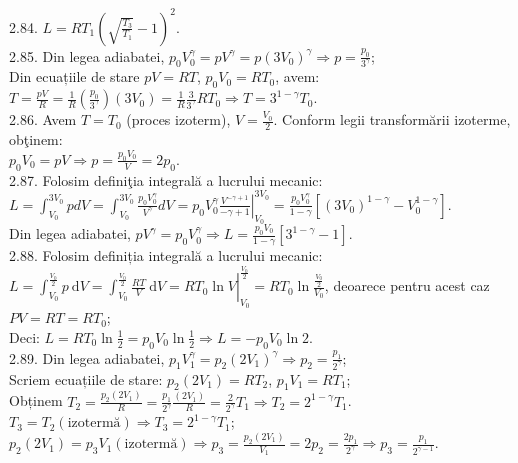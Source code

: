 2.84. $L=R T_{1}\left(\sqrt{\frac{T_{3}}{T_{1}}}-1\right)^{2}$.\\

2.85. Din legea adiabatei, $p_{0} V_{0}^{\gamma}=p V^{\gamma}=p\left(3 V_{0}\right)^{\gamma} \Rightarrow p=\frac{p_{0}}{3^{\gamma}}$;\\ Din ecuațiile de stare $p V=R T$, $p_{0} V_{0}=R T_{0}$, avem:\\ $T=\frac{p V}{R}=\frac{1}{R}\left(\frac{p_{0}}{3^{\gamma}}\right)\left(3 V_{0}\right)=\frac{1}{R} \frac{3}{3^{\gamma}} R T_{0} \Rightarrow T=3^{1-\gamma} T_{0}$.\\

2.86. Avem $T=T_{0}$ (proces izoterm), $V=\frac{V_{0}}{2}$. Conform legii transformării izoterme, obţinem:\\ $p_{0} V_{0}=p V \Rightarrow p=\frac{p_{0} V_{0}}{V}=2 p_{0}$.\\

2.87. Folosim definiţia integrală a lucrului mecanic:\\ $L=\int_{V_{0}}^{3 V_{0}} p d V=\int_{V_{0}}^{3 V_{0}} \frac{p_{0} V_{0}^{\gamma}}{V^{\gamma}} d V=\left.p_{0} V_{0}^{\gamma} \frac{V^{-\gamma+1}}{-\gamma+1}\right|_{V_{0}} ^{3 V_{0}}=\frac{p_{0} V_{0}^{\gamma}}{1-\gamma}\left[\left(3 V_{0}\right)^{1-\gamma}-V_{0}^{1-\gamma}\right]$.\\ Din legea adiabatei, $p V^{\gamma}=p_{0} V_{0}^{\gamma} \Rightarrow L=\frac{p_{0} V_{0}}{1-\gamma}\left[3^{1-\gamma}-1\right]$.\\

2.88. Folosim definiția integrală a lucrului mecanic:\\ $L=\int_{V_{0}}^{\frac{V_{0}}{2}} p \mathrm{~d} V=\left.\int_{V_{0}}^{\frac{V_{0}}{2}} \frac{R T}{V} \mathrm{~d} V=R T_{0} \ln V\right|_{V_{0}} ^{\frac{V_{0}}{2}}=R T_{0} \ln \frac{\frac{V_{0}}{2}}{V_{0}}$, deoarece pentru acest caz $P V=R T=R T_{0}$;\\ Deci: $L=R T_{0} \ln \frac{1}{2}=p_{0} V_{0} \ln \frac{1}{2} \Rightarrow L=-p_{0} V_{0} \ln 2$.\\

2.89. Din legea adiabatei, $p_{1} V_{1}^{\gamma}=p_{2}\left(2 V_{1}\right)^{\gamma} \Rightarrow p_{2}=\frac{p_{1}}{2^{\gamma}}$;\\ Scriem ecuațiile de stare: $p_{2}\left(2 V_{1}\right)=R T_{2}$, $p_{1} V_{1}=R T_{1}$;\\ Obținem $T_{2}=\frac{p_{2}\left(2 V_{1}\right)}{R}=\frac{p_{1}}{2^{\gamma}} \frac{\left(2 V_{1}\right)}{R}=\frac{2}{2^{\gamma}} T_{1} \Rightarrow T_{2}=2^{1-\gamma} T_{1}$.\\ $T_{3}=T_{2}(\text {izotermă}) \Rightarrow T_{3}=2^{1-\gamma} T_{1}$;\\ $p_{2}\left(2 V_{1}\right)=p_{3} V_{1}(\text {izotermă}) \Rightarrow p_{3}=\frac{p_{2}\left(2 V_{1}\right)}{V_{1}}=2 p_{2}=\frac{2 p_{1}}{2^{\gamma}} \Rightarrow p_{3}=\frac{p_{1}}{2^{\gamma-1}}$.\\

